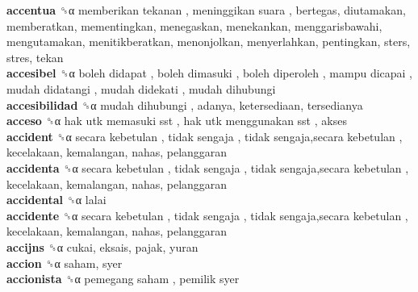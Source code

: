 \textbf{accentua} ␝α   memberikan tekanan ,  meninggikan suara , bertegas, diutamakan, memberatkan, mementingkan, menegaskan, menekankan, menggarisbawahi, mengutamakan, menitikberatkan, menonjolkan, menyerlahkan, pentingkan, sters, stres, tekan  \\
\textbf{accesibel} ␝α   boleh didapat ,  boleh dimasuki ,  boleh diperoleh ,  mampu dicapai ,  mudah didatangi ,  mudah didekati ,  mudah dihubungi   \\
\textbf{accesibilidad} ␝α   mudah dihubungi , adanya, ketersediaan, tersedianya  \\
\textbf{acceso} ␝α   hak utk memasuki sst ,  hak utk menggunakan sst , akses  \\
\textbf{accident} ␝α   secara kebetulan ,  tidak sengaja ,  tidak sengaja,secara kebetulan , kecelakaan, kemalangan, nahas, pelanggaran  \\
\textbf{accidenta} ␝α   secara kebetulan ,  tidak sengaja ,  tidak sengaja,secara kebetulan , kecelakaan, kemalangan, nahas, pelanggaran  \\
\textbf{accidental} ␝α  lalai  \\
\textbf{accidente} ␝α   secara kebetulan ,  tidak sengaja ,  tidak sengaja,secara kebetulan , kecelakaan, kemalangan, nahas, pelanggaran  \\
\textbf{accijns} ␝α  cukai, eksais, pajak, yuran  \\
\textbf{accion} ␝α  saham, syer  \\
\textbf{accionista} ␝α   pemegang saham ,  pemilik syer   \\
